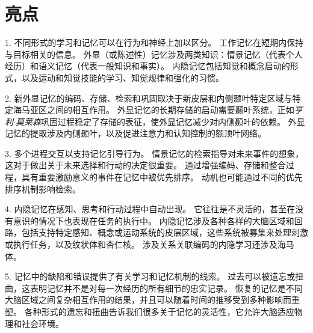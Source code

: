 \section{亮点}

1. 不同形式的学习和记忆可以在行为和神经上加以区分。 工作记忆在短期内保持与目标相关的信息。
外显（或陈述性）记忆涉及两类知识：情景记忆（代表个人经历）和语义记忆（代表一般知识和事实）。
内隐记忆包括知觉和概念启动的形式，以及运动和知觉技能的学习、知觉规律和强化的习惯。 


2. 新外显记忆的编码、存储、检索和巩固取决于新皮层和内侧颞叶特定区域与特定海马亚区之间的相互作用。
外显记忆的长期存储的启动需要颞叶系统，正如\textit{亨利$\cdot$莫莱森}巩固过程稳定了存储的表征，使外显记忆减少对内侧颞叶的依赖。
外显记忆的提取涉及内侧颞叶，以及促进注意力和认知控制的额顶叶网络。


3. 多个进程交互以支持记忆引导行为。
情景记忆的检索指导对未来事件的想象，这对于做出关于未来选择和行动的决定很重要。
通过增强编码、存储和整合过程，具有重要激励意义的事件在记忆中被优先排序。
动机也可能通过不同的优先排序机制影响检索。 


4. 内隐记忆在感知、思考和行动过程中自动出现。
它往往是不灵活的，甚至在没有意识的情况下也表现在任务的执行中。
内隐记忆涉及各种各样的大脑区域和回路，包括支持特定感知、概念或运动系统的皮层区域，这些系统被募集来处理刺激或执行任务，以及纹状体和杏仁核。
涉及关系关联编码的内隐学习还涉及海马体。


5. 记忆中的缺陷和错误提供了有关学习和记忆机制的线索。
过去可以被遗忘或扭曲，这表明记忆并不是对每一次经历的所有细节的忠实记录。
恢复的记忆是不同大脑区域之间复杂相互作用的结果，并且可以随着时间的推移受到多种影响而重塑。
各种形式的遗忘和扭曲告诉我们很多关于记忆的灵活性，它允许大脑适应物理和社会环境。



